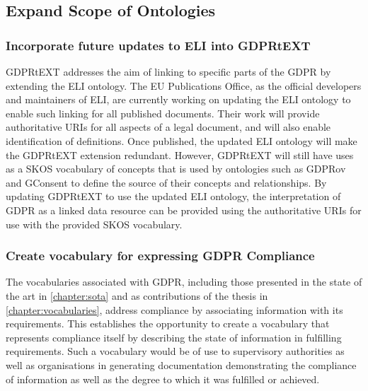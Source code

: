 \subsection*{Expand Scope of Ontologies}
\subsubsection{Incorporate future updates to ELI into GDPRtEXT}
GDPRtEXT addresses the aim of linking to specific parts of the GDPR by extending the ELI ontology. The EU Publications Office, as the official developers and maintainers of ELI, are currently working on updating the ELI ontology to enable such linking for all published documents. Their work will provide authoritative URIs for all aspects of a legal document, and will also enable identification of definitions. Once published, the updated ELI ontology will make the GDPRtEXT extension redundant. However, GDPRtEXT will still have uses as a SKOS vocabulary of concepts that is used by ontologies such as GDPRov and GConsent to define the source of their concepts and relationships. By updating GDPRtEXT to use the updated ELI ontology, the interpretation of GDPR as a linked data resource can be provided using the authoritative URIs for use with the provided SKOS vocabulary.

\subsubsection{Create vocabulary for expressing GDPR Compliance}
The vocabularies associated with GDPR, including those presented in the state of the art in \autoref{chapter:sota} and as contributions of the thesis in \autoref{chapter:vocabularies}, address compliance by associating information with its requirements. This establishes the opportunity to create a vocabulary that represents compliance itself by describing the state of information in fulfilling requirements. Such a vocabulary would be of use to supervisory authorities as well as organisations in generating documentation demonstrating the compliance of information as well as the degree to which it was fulfilled or achieved.


